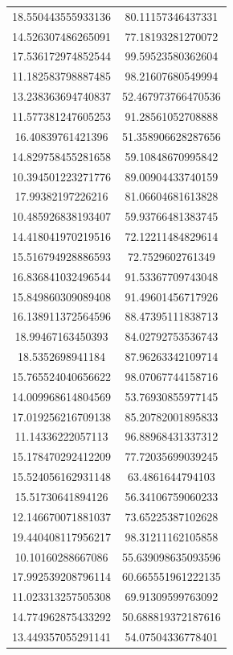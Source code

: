 \begin{table}
\begin{tabular}{cc}
18.550443555933136 & 80.11157346437331 \\
14.526307486265091 & 77.18193281270072 \\
17.536172974852544 & 99.59523580362604 \\
11.182583798887485 & 98.21607680549994 \\
13.238363694740837 & 52.467973766470536 \\
11.577381247605253 & 91.28561052708888 \\
16.40839761421396 & 51.358906628287656 \\
14.829758455281658 & 59.10848670995842 \\
10.394501223271776 & 89.00904433740159 \\
17.99382197226216 & 81.06604681613828 \\
10.485926838193407 & 59.93766481383745 \\
14.418041970219516 & 72.12211484829614 \\
15.516794928886593 & 72.7529602761349 \\
16.836841032496544 & 91.53367709743048 \\
15.849860309089408 & 91.49601456717926 \\
16.138911372564596 & 88.47395111838713 \\
18.99467163450393 & 84.02792753536743 \\
18.5352698941184 & 87.96263342109714 \\
15.765524040656622 & 98.07067744158716 \\
14.009968614804569 & 53.76930855977145 \\
17.019256216709138 & 85.20782001895833 \\
11.14336222057113 & 96.88968431337312 \\
15.178470292412209 & 77.72035699039245 \\
15.524056162931148 & 63.4861644794103 \\
15.51730641894126 & 56.34106759060233 \\
12.146670071881037 & 73.65225387102628 \\
19.440408117956217 & 98.31211162105858 \\
10.10160288667086 & 55.639098635093596 \\
17.992539208796114 & 60.665551961222135 \\
11.023313257505308 & 69.91309599763092 \\
14.774962875433292 & 50.688819372187616 \\
13.449357055291141 & 54.07504336778401 \\

\end{tabular}
\end{table}
